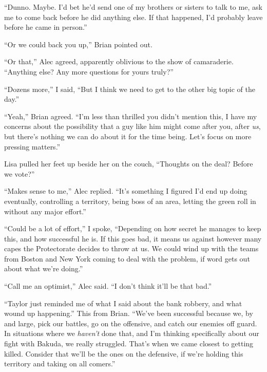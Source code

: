 ``Dunno.  Maybe.  I'd bet he'd send one of my brothers or sisters to talk to me, ask me to come back before he did anything else.  If that happened, I'd probably leave before he came in person.''



``Or we could back you up,'' Brian pointed out.



``Or that,'' Alec agreed, apparently oblivious to the show of camaraderie.  ``Anything else?  Any more questions for yours truly?''



``Dozens more,'' I said, ``But I think we need to get to the other big topic of the day.''



``Yeah,'' Brian agreed.  ``I'm less than thrilled you didn't mention this, I have my concerns about the possibility that a guy like him might come after you, after \emph{us}, but there's nothing we can do about it for the time being.  Let's focus on more pressing matters.''



Lisa pulled her feet up beside her on the couch, ``Thoughts on the deal?  Before we vote?''



``Makes sense to me,'' Alec replied.  ``It's something I figured I'd end up doing eventually, controlling a territory, being boss of an area, letting the green roll in without any major effort.''



``Could be a lot of effort,'' I spoke, ``Depending on how secret he manages to keep this, and how successful he is.  If this goes bad, it means us against however many capes the Protectorate decides to throw at us.  We could wind up with the teams from Boston and New York coming to deal with the problem, if word gets out about what we're doing.''



``Call me an optimist,'' Alec said. ``I don't think it'll be that bad.''



``Taylor just reminded me of what I said about the bank robbery, and what wound up happening.''  This from Brian.  ``We've been successful because we, by and large, pick our battles, go on the offensive, and catch our enemies off guard.  In situations where we \emph{haven't} done that, and I'm thinking specifically about our fight with Bakuda, we really struggled.  That's when we came closest to getting killed.  Consider that we'll be the ones on the defensive, if we're holding this territory and taking on all comers.''



